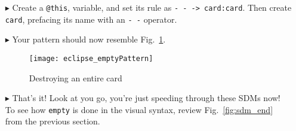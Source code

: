 \begin{itemize}
\item[$\blacktriangleright$] Create a \texttt{@this}, variable, and set its rule as \texttt{-~- -> card:card}. Then create \texttt{card}, prefacing its name
with an \texttt{-~-} operator.

\vspace{0.5cm}

\item[$\blacktriangleright$] Your pattern should now resemble Fig.~\ref{fig:emptyPattern}.

\vspace{0.5cm}

\begin{figure}[htpb]
\begin{center}
  \texttt{[image: eclipse\_emptyPattern]}
  \caption{Destroying an entire card}
  \label{fig:emptyPattern}
\end{center}
\end{figure}

\item[$\blacktriangleright$] That's it! Look at you go, you're just speeding through these SDMs now! To see how \texttt{empty} is done in the visual syntax,
review Fig.~\ref{fig:sdm_end} from the previous section.

\end{itemize}
